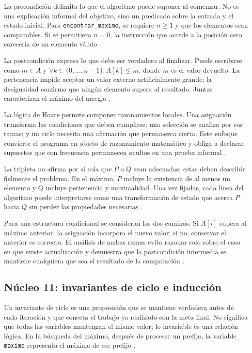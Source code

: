 \documentclass[12pt,letterpaper]{article}
\newcommand{\codigo}[1]{\texttt{#1}}
\begin{document}
La precondición delimita lo que el algoritmo puede suponer al comenzar. No es una explicación informal del objetivo, sino un predicado sobre la entrada y el estado inicial. Para \codigo{encontrar\_maximo}, se requiere $n\geq 1$ y que los elementos sean comparables. Si se permitiera $n=0$, la instrucción que accede a la posición cero carecería de un elemento válido \citep{hoare1969,cormen2022,goodrichcpp2011}.

La postcondición expresa lo que debe ser verdadero al finalizar. Puede escribirse como $m\in A$ y $\forall k\in\{0,\ldots,n-1\}: A[k]\leq m$, donde $m$ es el valor devuelto. La pertenencia impide aceptar un valor externo artificialmente grande; la desigualdad confirma que ningún elemento supera al resultado. Juntas caracterizan el máximo del arreglo \citep{hoare1969,cormen2022,zanabria2026}.

La lógica de Hoare permite componer razonamientos locales. Una asignación transforma las condiciones que deben cumplirse; una selección se analiza por sus ramas; y un ciclo necesita una afirmación que permanezca cierta. Este enfoque convierte el programa en objeto de razonamiento matemático y obliga a declarar supuestos que con frecuencia permanecen ocultos en una prueba informal \citep{hoare1969,dijkstra1975,liskov1974}.

La tripleta no afirma por sí sola que $P$ o $Q$ sean adecuadas: estas deben describir fielmente el problema. En el máximo, $P$ incluye la existencia de al menos un elemento y $Q$ incluye pertenencia y maximalidad. Una vez fijadas, cada línea del algoritmo puede interpretarse como una transformación de estado que acerca $P$ hacia $Q$ sin perder las propiedades necesarias \citep{hoare1969,apt2009,cormen2022}.

Para una estructura condicional se consideran los dos caminos. Si $A[i]$ supera al máximo anterior, la asignación incorpora el nuevo valor; si no, conservar el anterior es correcto. El análisis de ambas ramas evita razonar solo sobre el caso en que existe actualización y demuestra que la postcondición intermedia se mantiene cualquiera que sea el resultado de la comparación \citep{hoare1969,dijkstra1975,apt2009}.

\subsection{Núcleo 11: invariantes de ciclo e inducción}

Un invariante de ciclo es una proposición que se mantiene verdadera antes de cada iteración y que conecta el trabajo ya realizado con la meta final. No significa que todas las variables mantengan el mismo valor; lo invariable es una relación lógica. En la búsqueda del máximo, después de procesar un prefijo, la variable \codigo{maximo} representa el máximo de ese prefijo \citep{cormen2022,hoare1969,zanabria2026}.
\end{document}
